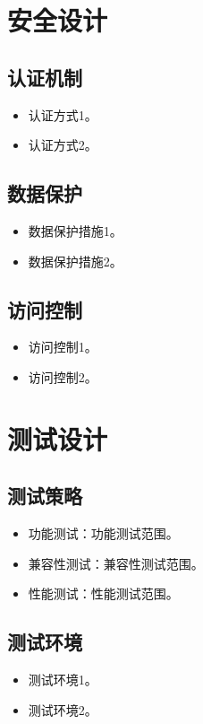 \documentclass[a4paper,12pt]{article}
\begin{document}


\section{安全设计}

\subsection{认证机制}

\begin{itemize}[leftmargin=2em]
  \item {{认证方式1}}。
  \item {{认证方式2}}。
\end{itemize}

\subsection{数据保护}

\begin{itemize}[leftmargin=2em]
  \item {{数据保护措施1}}。
  \item {{数据保护措施2}}。
\end{itemize}

\subsection{访问控制}

\begin{itemize}[leftmargin=2em]
  \item {{访问控制1}}。
  \item {{访问控制2}}。
\end{itemize}


\section{测试设计}

\subsection{测试策略}

\begin{itemize}[leftmargin=2em]
  \item 功能测试：{{功能测试范围}}。
  \item 兼容性测试：{{兼容性测试范围}}。
  \item 性能测试：{{性能测试范围}}。
\end{itemize}

\subsection{测试环境}

\begin{itemize}[leftmargin=2em]
  \item {{测试环境1}}。
  \item {{测试环境2}}。
\end{itemize}
\end{document}
